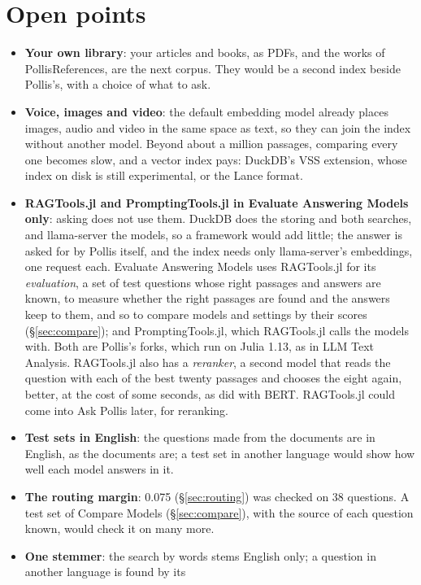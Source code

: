 \section{Open points}\label{sec:open}
\begin{itemize}
  \item \textbf{Your own library}: your articles and books, as PDFs, and the works of PollisReferences, are the next
    corpus. They would be a second index beside Pollis's, with a choice of what to ask.
  \item \textbf{Voice, images and video}: the default embedding model already places images, audio and video in the same space as
    text, so they can join the index without another model. Beyond about a million passages, comparing every one
    becomes slow, and a vector index pays: DuckDB's VSS extension, whose index on disk is still experimental, or the
    Lance format.
  \item \textbf{RAGTools.jl and PromptingTools.jl in Evaluate Answering Models only}: asking does not use them. DuckDB does the
    storing and both searches, and llama-server the models, so a framework would add little; the answer is asked for
    by Pollis itself, and the index needs only llama-server's embeddings, one request each. Evaluate Answering Models uses
    RAGTools.jl for its \emph{evaluation}, a set of test questions whose right passages and answers are known, to
    measure whether the right passages are found and the answers keep to them, and so to compare models and settings
    by their scores (\S\ref{sec:compare}); and PromptingTools.jl, which RAGTools.jl calls the models with. Both are
    Pollis's forks, which run on Julia 1.13, as in LLM Text Analysis. RAGTools.jl also has a \emph{reranker}, a second
    model that reads the question with each of the best twenty passages and chooses the eight again, better, at the
    cost of some seconds, as  did with BERT. RAGTools.jl could come into Ask Pollis later, for reranking.
  \item \textbf{Test sets in English}: the questions made from the documents are in English, as the documents are; a
    test set in another language would show how well each model answers in it.
  \item \textbf{The routing margin}: 0.075 (\S\ref{sec:routing}) was checked on 38 questions. A test set of Compare
    Models (\S\ref{sec:compare}), with the source of each question known, would check it on many more.
  \item \textbf{One stemmer}: the search by words stems English only; a question in another language is found by its

\end{itemize}
